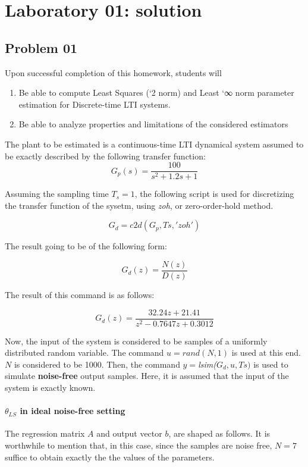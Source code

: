 \chapter{Laboratory 01: solution}
\section{Problem 01}
Upon successful completion of this homework, students will
\begin{enumerate}
\item Be able to compute Least Squares (`2 norm) and Least `∞ norm parameter estimation for
Discrete-time LTI systems.
\item Be able to analyze properties and limitations of the considered estimators
\end{enumerate}

The plant to be estimated is a continuous-time LTI dynamical system assumed to be exactly described by the following transfer function:
\[
G_p(s) = \frac {100}{s^2 + 1.2 s + 1}
\]

Assuming the sampling time \(T_s = 1\), the following script is used for discretizing the transfer function of the sysetm, using \textit{zoh}, or zero-order-hold method.

\[G_d = c2d(G_p, Ts, 'zoh')\]

The result going to be of the following form:

\[G_d(z) = \frac{N(z)}{D(z)}\]

The result of this command is as follows:

\[
G_d(z) = \frac{32.24z + 21.41}{z^2 - 0.7647z + 0.3012}
\]

Now, the input of the system is considered to be samples of a uniformly distributed random variable. The command \textit{\(u = rand(N,1)\)} is used at this end. \(N\) is considered to be 1000. Then, the command \textit{ \(y =\)lsim(\(G_d, u, Ts)\)} is used to simulate \textbf{noise-free} output samples. Here, it is assumed that the input of the system is exactly known.


\subsubsection{\(\theta_{LS}\) in ideal noise-free setting}
The regression matrix \(A\) and output vector \(b\), are shaped as follows. It is worthwhile to mention that, in this case, since the samples are noise free, \(N = 7\) suffice to obtain exactly the the values of the parameters.

